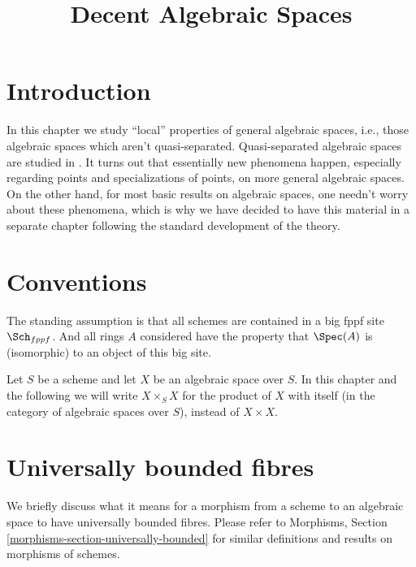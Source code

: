 

%


\title{Decent Algebraic Spaces}


\maketitle

\label{section-phantom}

\tableofcontents

\section{Introduction}
\label{section-introduction}

\noindent
In this chapter we study ``local'' properties of general
algebraic spaces, i.e., those algebraic spaces which aren't quasi-separated.
Quasi-separated algebraic spaces are studied in \cite{Kn}.
It turns out that essentially new phenomena happen, especially
regarding points and specializations of points, on more
general algebraic spaces. On the other hand, for most basic results
on algebraic spaces, one needn't worry about these phenomena, which is why
we have decided to have this material in a separate chapter following
the standard development of the theory.



\section{Conventions}
\label{section-conventions}

\noindent
The standing assumption is that all schemes are contained in
a big fppf site $\Sch_{fppf}$. And all rings $A$ considered
have the property that $\Spec(A)$ is (isomorphic) to an
object of this big site.

\medskip\noindent
Let $S$ be a scheme and let $X$ be an algebraic space over $S$.
In this chapter and the following we will write $X \times_S X$
for the product of $X$ with itself (in the category of algebraic
spaces over $S$), instead of $X \times X$.



\section{Universally bounded fibres}
\label{section-universally-bounded}

\noindent
We briefly discuss what it means for a morphism from a scheme to an
algebraic space to have universally bounded fibres. Please refer to
Morphisms, Section \ref{morphisms-section-universally-bounded}
for similar definitions and results on morphisms of schemes.

